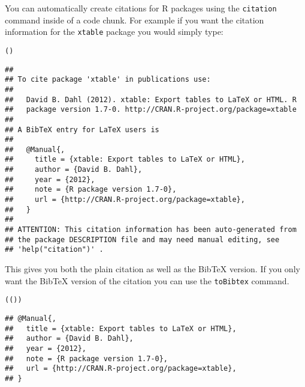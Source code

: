 You can automatically create citations for R packages using the \texttt{citation} command inside of a code chunk. For example if you want the citation information for the \texttt{xtable} package you would simply type:

{\small
\begin{knitrout}
\color{fgcolor}\begin{kframe}
\begin{alltt}
()
\end{alltt}
\begin{verbatim}
## 
## To cite package 'xtable' in publications use:
## 
##   David B. Dahl (2012). xtable: Export tables to LaTeX or HTML. R
##   package version 1.7-0. http://CRAN.R-project.org/package=xtable
## 
## A BibTeX entry for LaTeX users is
## 
##   @Manual{,
##     title = {xtable: Export tables to LaTeX or HTML},
##     author = {David B. Dahl},
##     year = {2012},
##     note = {R package version 1.7-0},
##     url = {http://CRAN.R-project.org/package=xtable},
##   }
## 
## ATTENTION: This citation information has been auto-generated from
## the package DESCRIPTION file and may need manual editing, see
## 'help("citation")' .
\end{verbatim}
\end{kframe}
\end{knitrout}

}

\noindent This gives you both the plain citation as well as the BibTeX version. If you only want the BibTeX version of the citation you can use the \texttt{toBibtex} command.

\begin{knitrout}
\color{fgcolor}\begin{kframe}
\begin{alltt}
(())
\end{alltt}
\begin{verbatim}
## @Manual{,
##   title = {xtable: Export tables to LaTeX or HTML},
##   author = {David B. Dahl},
##   year = {2012},
##   note = {R package version 1.7-0},
##   url = {http://CRAN.R-project.org/package=xtable},
## }
\end{verbatim}
\end{kframe}
\end{knitrout}


